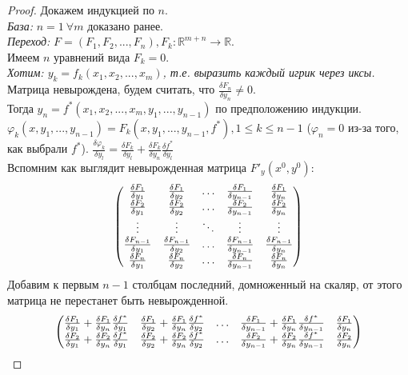 \documentclass[a4paper]{article}
\theoremstyle{indented}
\theoremstyle{definition}
\theoremstyle{remark}
\begin{document}
\begin{proof}
    Докажем индукцией по $n$.\\
    \textit{База: } $n=1 \ \forall m$ доказано ранее.\\
    \textit{Переход: } $F=(F_1, F_2, ... , F_n), F_k: \mathbb{R}^{m+n} \to \mathbb{R}$.\\
    Имеем $n$ уравнений вида $F_k = 0$.\\ 
    \textit{Хотим: $y_k=f_k(x_1, x_2, ..., x_m)$, т.е. выразить каждый игрик через иксы.}\\
    Матрица невырождена, будем считать, что $\frac{\delta F_n}{\delta y_n} \not= 0$.\\
    Тогда $y_n = f^*(x_1, x_2, ... , x_m, y_1, ... , y_{n-1})$
    по предположению индукции. \\
    $\varphi_k(x,y_1, ..., y_{n-1}) = F_k(x,y_1, ..., y_{n-1}, f^*), 1 \leq k \leq n-1$ ($\varphi_n = 0$ из-за того, как выбрали $f^*$).
    $\frac{\delta \varphi_k}{\delta y_l} = \frac{\delta F_k}{\delta y_l} + \frac{\delta F_k}{\delta y_n} \frac{\delta f^*}{\delta y_l}$\\
    Вспомним как выглядит невырожденная матрица $F'_y(x^0, y^0)$:
    $$
    \begin{pmatrix}
        \df{F_1}{y_1} & \df{F_1}{y_2} &\ldots & \df{F_1}{y_{n-1}} & \df{F_1}{y_n}\\
        \df{F_2}{y_1} & \df{F_2}{y_2} &\ldots & \df{F_2}{y_{n-1}} & \df{F_2}{y_n}\\
        \vdots                        & \vdots                        &\ddots & \vdots                        &  \vdots                      \\
        \df{F_{n-1}}{y_1} & \df{F_{n-1}}{y_2} &\ldots & \df{F_{n-1}}{y_{n-1}} & \df{F_{n-1}}{y_n}\\
        \df{F_n}{y_1} & \df{F_n}{y_2} &\ldots & \df{F_n}{y_{n-1}} & \df{F_n}{y_n}\\
    \end{pmatrix}    
    $$
    Добавим к первым $n-1$ столбцам последний, домноженный на скаляр, от этого матрица не перестанет быть невырожденной.
    $$
    \begin{pmatrix}
        \df{F_1}{y_1} + \df{F_1}{y_n} \df{f^*}{y_1} & \df{F_1}{y_2} + \df{F_1}{y_n} \df{f^*}{y_2} &\ldots & \df{F_1}{y_{n-1}} + \df{F_1}{y_n} \df{f^*}{y_{n-1}} & \df{F_1}{y_n}\\
        \df{F_2}{y_1} + \df{F_2}{y_n} \df{f^*}{y_1} & \df{F_2}{y_2} + \df{F_2}{y_n} \df{f^*}{y_2} &\ldots & \df{F_2}{y_{n-1}} + \df{F_2}{y_n} \df{f^*}{y_{n-1}} & \df{F_2}{y_n}\\

\end{pmatrix}$$
\end{proof}
\end{document}
